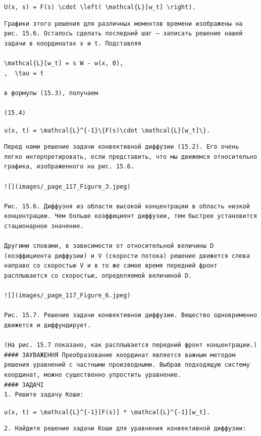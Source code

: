 \documentclass[
  ukrainian,
]{article}
\begin{document}
\texttt{U(x,\ s)\ =\ F(s)\ \textbackslash{}cdot\ \textbackslash{}left(\ \textbackslash{}mathcal\{L\}{[}w\_t{]}\ \textbackslash{}right).}

\begin{verbatim}
Графики этого решения для различных моментов времени изображены на рис. 15.6. Осталось сделать последний шаг — записать решение нашей задачи в координатах x и t. Подставляя

\mathcal{L}[w_t] = s W - w(x, 0),
,  \tau = t 

в формулы (15.3), получаем

(15.4)
\end{verbatim}

\texttt{u(x,\ t)\ =\ \textbackslash{}mathcal\{L\}\^{}\{-1\}\textbackslash{}\{F(s)\textbackslash{}cdot\ \textbackslash{}mathcal\{L\}{[}w\_t{]}\textbackslash{}\}.}

\begin{verbatim}
Перед нами решение задачи конвективной диффузии (15.2). Его очень легко интерпретировать, если представить, что мы движемся относительно графика, изображенного на рис. 15.6.

![](images/_page_117_Figure_3.jpeg)

Рис. 15.6. Диффузня из области высокой концентрации в область низкой концентрации. Чем больше коэффициент диффузии, тем быстрее установится стационарное значение.

Другими словами, в зависимости от относительной величины D (коэффициента диффузии) и V (скорости потока) решение движется слева направо со скоростью V и в то же самое время передний фронт расплывается со скоростью, определяемой величиной D.

![](images/_page_117_Figure_6.jpeg)

Рис. 15.7. Решение задачи конвективнои диффузии. Вещество одновременно движется и диффундирует.

(На рис. 15.7 показано, как расплывается передний фронт концентрации.)
#### ЗАУВАЖЕННЯ Преобразование координат является важным методом решения уравнений с частными производными. Выбрав подходящую систему координат, можно существенно упростить уравнение.
#### ЗАДАЧІ
1. Решите задачу Коши:
\end{verbatim}

\texttt{u(x,\ t)\ =\ \textbackslash{}mathcal\{L\}\^{}\{-1\}{[}F(s){]}\ *\ \textbackslash{}mathcal\{L\}\^{}\{-1\}{[}w\_t{]}.}

\begin{verbatim}
2. Найдите решение задачи Коши для уравнения конвективной диффузии:
\end{verbatim}
\end{document}
